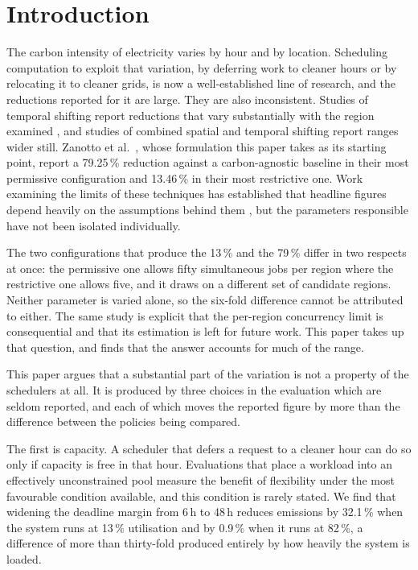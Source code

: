 \section{Introduction}
\label{sec:intro}

The carbon intensity of electricity varies by hour and by location. Scheduling
computation to exploit that variation, by deferring work to cleaner hours or by
relocating it to cleaner grids, is now a well-established line of research, and
the reductions reported for it are large. They are also inconsistent. Studies
of temporal shifting report reductions that vary substantially with the region
examined \cite{wiesner2021letswait}, and studies of combined spatial and temporal
shifting report ranges wider still. Zanotto et
al.~\cite{zanotto2025usercentric}, whose formulation this paper takes as its
starting point, report a 79.25\,\% reduction against a carbon-agnostic baseline
in their most permissive configuration and 13.46\,\% in their most restrictive
one. Work examining the limits of these techniques has established that headline
figures depend heavily on the assumptions behind them
\cite{sukprasert2024limitations}, but the parameters responsible have not been
isolated individually.

The two configurations that produce the 13\,\% and the 79\,\% differ in two
respects at once: the permissive one allows fifty simultaneous jobs per region
where the restrictive one allows five, and it draws on a different set of
candidate regions. Neither parameter is varied alone, so the six-fold difference
cannot be attributed to either. The same study is explicit that the per-region
concurrency limit is consequential and that its estimation is left for future
work. This paper takes up that question, and finds that the answer accounts for
much of the range.

This paper argues that a substantial part of the variation is not a property of
the schedulers at all. It is produced by three choices in the evaluation which
are seldom reported, and each of which moves the reported figure by more than
the difference between the policies being compared.

The first is capacity. A scheduler that defers a request to a cleaner hour can
do so only if capacity is free in that hour. Evaluations that place a workload
into an effectively unconstrained pool measure the benefit of flexibility under
the most favourable condition available, and this condition is rarely stated.
We find that widening the deadline margin from 6\,h to 48\,h reduces emissions
by 32.1\,\% when the system runs at 13\,\% utilisation and by 0.9\,\% when it
runs at 82\,\%, a difference of more than thirty-fold produced entirely by how
heavily the system is loaded.

